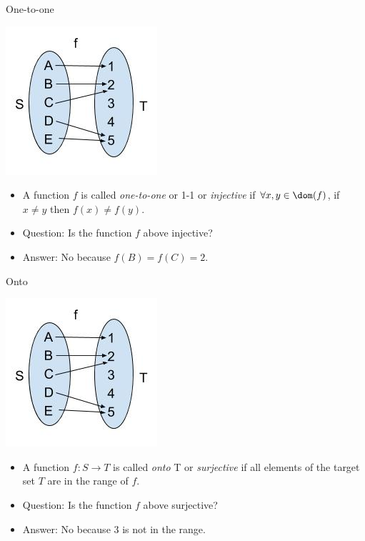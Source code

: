 \documentclass{beamer}
\begin{document}
\begin{frame}{One-to-one}
\begin{center}
\includegraphics[scale=0.25]{function1}
\end{center}

\begin{itemize}
\item A function $f$ is called \emph{one-to-one} or 1-1 or \emph{injective} if
$\forall x, y \in \dom(f)$, if $x\not=y$ then $f(x)\not=f(y)$.
\item Question: Is the function $f$ above injective?
\item Answer: No because $f(B) = f(C) = 2$.
\end{itemize}
\end{frame}

\begin{frame}{Onto}
\begin{center}
\includegraphics[scale=0.25]{function1}
\end{center}

\begin{itemize}
\item A function $f:S\to T$ is called \emph{onto} T or \emph{surjective} if
all elements of the target set $T$ are in the range of $f$.
\item Question: Is the function $f$ above surjective?
\item Answer: No because 3 is not in the range.
\end{itemize}
\end{frame}
\end{document}

